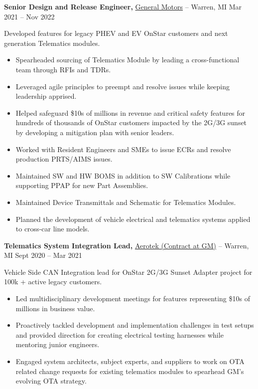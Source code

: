 \documentclass[11pt]{article}       %
\begin{document}
\textbf{Senior Design and Release Engineer,} \href{}{General Motors} -- Warren, MI \hfill Mar 2021 -- Nov 2022 \\
\vspace{-9pt}
\begin{flushleft}
  Developed features for legacy PHEV and EV OnStar customers and next generation Telematics modules.
\end{flushleft}
\vspace{-21pt}
\begin{itemize}
  \item Spearheaded sourcing of Telematics Module by leading a cross-functional team through RFIs and TDRs.
  \item Leveraged agile principles to preempt and resolve issues while keeping leadership apprised.
  \item Helped safeguard \$10s of millions in revenue and critical safety features for hundreds of thousands of OnStar customers impacted by the 2G/3G sunset by developing a mitigation plan with senior leaders.
  \item Worked with Resident Engineers and SMEs to issue ECRs and resolve production PRTS/AIMS issues.
  \item Maintained SW and HW BOMS in addition to SW Calibrations while supporting PPAP for new Part Assemblies.
  \item Maintained Device Transmittals and Schematic for Telematics Modules.
  \item Planned the development of vehicle electrical and telematics systems applied to cross-car line models. 
\end{itemize}

\textbf{Telematics System Integration Lead,} \href{}{Aerotek (Contract at GM)} -- Warren, MI \hfill Sept 2020 -- Mar 2021 \\
\vspace{-9pt}
\begin{flushleft}
  Vehicle Side CAN Integration lead for OnStar 2G/3G Sunset Adapter project for 100k + active legacy customers.
\end{flushleft}
\vspace{-21pt}
\begin{itemize}
  \item Led multidisciplinary development meetings for features representing \$10s of millions in business value.
  \item Proactively tackled development and implementation challenges in test setups and provided direction for creating electrical testing harnesses while mentoring junior engineers.
  \item Engaged system architects, subject experts, and suppliers to work on OTA related change requests for existing telematics modules to spearhead GM’s evolving OTA strategy.
\end{itemize}
\end{document}
